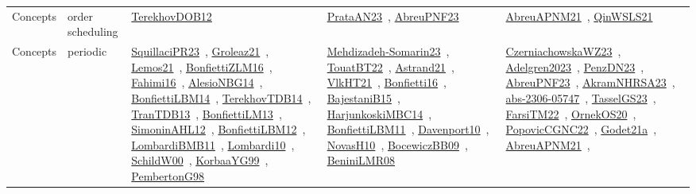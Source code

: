 {\begin{longtable}{lp{3cm}>{\raggedright\arraybackslash}p{6cm}>{\raggedright\arraybackslash}p{6cm}>{\raggedright\arraybackslash}p{8cm}}
Concepts & order scheduling & \href{../works/TerekhovDOB12.pdf}{TerekhovDOB12}~\cite{TerekhovDOB12} & \href{../works/PrataAN23.pdf}{PrataAN23}~\cite{PrataAN23}, \href{../works/AbreuPNF23.pdf}{AbreuPNF23}~\cite{AbreuPNF23} & \href{../works/AbreuAPNM21.pdf}{AbreuAPNM21}~\cite{AbreuAPNM21}, \href{../works/QinWSLS21.pdf}{QinWSLS21}~\cite{QinWSLS21}\\
Concepts & periodic & \href{../works/SquillaciPR23.pdf}{SquillaciPR23}~\cite{SquillaciPR23}, \href{../works/Groleaz21.pdf}{Groleaz21}~\cite{Groleaz21}, \href{../works/Lemos21.pdf}{Lemos21}~\cite{Lemos21}, \href{../works/BonfiettiZLM16.pdf}{BonfiettiZLM16}~\cite{BonfiettiZLM16}, \href{../works/Fahimi16.pdf}{Fahimi16}~\cite{Fahimi16}, \href{../works/AlesioNBG14.pdf}{AlesioNBG14}~\cite{AlesioNBG14}, \href{../works/BonfiettiLBM14.pdf}{BonfiettiLBM14}~\cite{BonfiettiLBM14}, \href{../works/TerekhovTDB14.pdf}{TerekhovTDB14}~\cite{TerekhovTDB14}, \href{../works/TranTDB13.pdf}{TranTDB13}~\cite{TranTDB13}, \href{../works/BonfiettiLM13.pdf}{BonfiettiLM13}~\cite{BonfiettiLM13}, \href{../works/SimoninAHL12.pdf}{SimoninAHL12}~\cite{SimoninAHL12}, \href{../works/BonfiettiLBM12.pdf}{BonfiettiLBM12}~\cite{BonfiettiLBM12}, \href{../works/LombardiBMB11.pdf}{LombardiBMB11}~\cite{LombardiBMB11}, \href{../works/Lombardi10.pdf}{Lombardi10}~\cite{Lombardi10}, \href{../works/SchildW00.pdf}{SchildW00}~\cite{SchildW00}, \href{../works/KorbaaYG99.pdf}{KorbaaYG99}~\cite{KorbaaYG99}, \href{../works/PembertonG98.pdf}{PembertonG98}~\cite{PembertonG98} & \href{../works/Mehdizadeh-Somarin23.pdf}{Mehdizadeh-Somarin23}~\cite{Mehdizadeh-Somarin23}, \href{../works/TouatBT22.pdf}{TouatBT22}~\cite{TouatBT22}, \href{../works/Astrand21.pdf}{Astrand21}~\cite{Astrand21}, \href{../works/VlkHT21.pdf}{VlkHT21}~\cite{VlkHT21}, \href{../works/Bonfietti16.pdf}{Bonfietti16}~\cite{Bonfietti16}, \href{../works/BajestaniB15.pdf}{BajestaniB15}~\cite{BajestaniB15}, \href{../works/HarjunkoskiMBC14.pdf}{HarjunkoskiMBC14}~\cite{HarjunkoskiMBC14}, \href{../works/BonfiettiLBM11.pdf}{BonfiettiLBM11}~\cite{BonfiettiLBM11}, \href{../works/Davenport10.pdf}{Davenport10}~\cite{Davenport10}, \href{../works/NovasH10.pdf}{NovasH10}~\cite{NovasH10}, \href{../works/BocewiczBB09.pdf}{BocewiczBB09}~\cite{BocewiczBB09}, \href{../works/BeniniLMR08.pdf}{BeniniLMR08}~\cite{BeniniLMR08} & \href{../works/CzerniachowskaWZ23.pdf}{CzerniachowskaWZ23}~\cite{CzerniachowskaWZ23}, \href{../works/Adelgren2023.pdf}{Adelgren2023}~\cite{Adelgren2023}, \href{../works/PenzDN23.pdf}{PenzDN23}~\cite{PenzDN23}, \href{../works/AbreuPNF23.pdf}{AbreuPNF23}~\cite{AbreuPNF23}, \href{../works/AkramNHRSA23.pdf}{AkramNHRSA23}~\cite{AkramNHRSA23}, \href{../works/abs-2306-05747.pdf}{abs-2306-05747}~\cite{abs-2306-05747}, \href{../works/TasselGS23.pdf}{TasselGS23}~\cite{TasselGS23}, \href{../works/FarsiTM22.pdf}{FarsiTM22}~\cite{FarsiTM22}, \href{../works/OrnekOS20.pdf}{OrnekOS20}~\cite{OrnekOS20}, \href{../works/PopovicCGNC22.pdf}{PopovicCGNC22}~\cite{PopovicCGNC22}, \href{../works/Godet21a.pdf}{Godet21a}~\cite{Godet21a}, \href{../works/AbreuAPNM21.pdf}{AbreuAPNM21}~\cite{AbreuAPNM21}, 
\end{longtable}}
